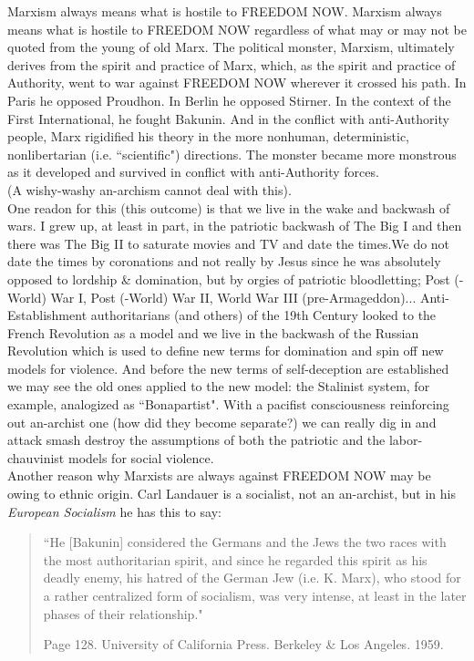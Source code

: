 Marxism always means what is hostile to FREEDOM NOW. Marxism always means what is hostile to FREEDOM NOW regardless of what may or may not be quoted from the young of old Marx. The political monster, Marxism, ultimately derives from the spirit and practice of Marx, which, as the spirit and practice of Authority, went to war against FREEDOM NOW wherever it crossed his path. In Paris he opposed Proudhon. In Berlin he opposed Stirner. In the context of the First International, he fought Bakunin. And in the conflict with anti-Authority people, Marx rigidified his theory in the more nonhuman, deterministic, nonlibertarian (i.e. ``scientific") directions. The monster became more monstrous as it developed and survived in conflict with anti-Authority forces.\\
(A wishy-washy an-archism cannot deal with this).\\
One readon for this (this outcome) is that we live in the wake and backwash of wars. I grew up, at least in part, in the patriotic backwash of The Big I and then there was The Big II to saturate movies and TV and date the times.We do not date the times by coronations and not really by Jesus since he was absolutely opposed to lordship \& domination, but by orgies of patriotic bloodletting; Post (-World) War I, Post (-World) War II, World War III (pre-Armageddon)... Anti-Establishment authoritarians (and others) of the 19th Century looked to the French Revolution as a model and we live in the backwash of the Russian Revolution which is used to define new terms for domination and spin off new models for violence. And before the new terms of self-deception are established we may see the old ones applied to the new model: the Stalinist system, for example, analogized as ``Bonapartist". With a pacifist consciousness reinforcing out an-archist one (how did they become separate?) we can really dig in and attack smash destroy the assumptions of both the patriotic and the labor-chauvinist models for social violence.\\
Another reason why Marxists are always against FREEDOM NOW may be owing to ethnic origin. Carl Landauer is a socialist, not an an-archist, but in his \emph{European Socialism} he has this to say:
\blockquote{``He [Bakunin] considered the Germans and the Jews the two races with the most authoritarian spirit, and since he regarded this spirit as his deadly enemy, his hatred of the German Jew (i.e. K. Marx), who stood for a rather centralized form of socialism, was very intense, at least in the later phases of their relationship."
\par\begin{flushright} Page 128. University of California Press. Berkeley \& Los Angeles. 1959. \end{flushright}
}
